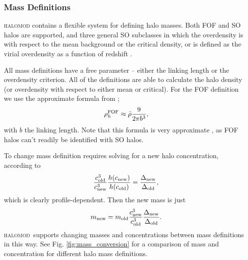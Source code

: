 \documentclass[5p,aas_macros]{elsarticle}
\newcommand{\halomod}{\textsc{halomod}\xspace} %
\providecommand{\DIFaddtex}[1]{{\protect\color{blue}\uwave{#1}}} %
\providecommand{\DIFaddbegin}{} %
\providecommand{\DIFaddend}{} %
\providecommand{\DIFadd}[1]{\texorpdfstring{\DIFaddtex{#1}}{#1}} %
\begin{document}
\subsubsection{Mass Definitions}
\label{sec:halomod:components:mass-def}
\textsc{halomod} contains a flexible system for defining halo masses. 
Both FOF and SO halos are supported, and three general SO subclasses in which the overdensity is with respect to the mean background or the critical density, or is defined as the virial overdensity as a function of redshift \citep{Bryan1998}. 

All mass definitions have a free parameter -- either the linking length or the overdensity criterion. All of the definitions are able to calculate the halo density (or overdensity with respect to either mean or critical). For the FOF definition we use the approximate formula from \cite{White2001};
\begin{equation}
    \rho_h^{\rm FOF} \approx \bar{\rho} \frac{9}{2\pi b^3},
\end{equation}
with $b$ the linking length. Note that this formula is very approximate \citep{More2011}, as FOF halos can't readily be identified with SO halos. 

To change mass definition requires solving for a new halo concentration, according to
\begin{equation}
    \DIFaddbegin \label{eq:convert_mass_c}
    \DIFaddend \frac{c_{\rm old}^3}{c_{\rm new}^3} \frac{h(c_{\rm new})}{h(c_{\rm old})} = \frac{\Delta_{\rm new}}{\Delta_{\rm old}},
\end{equation}
which is clearly profile-dependent. Then the new mass is just
\begin{equation}
    \DIFaddbegin \label{eq:convert_mass_m}
    \DIFaddend m_{\rm new} = m_{\rm old} \frac{c_{\rm new}^3}{c_{\rm old}^3} \frac{\Delta_{\rm new}}{\Delta_{\rm old}}.
\end{equation}
\halomod\  supports changing masses and concentrations \DIFaddbegin \DIFadd{(partially) }\DIFaddend between mass definitions in this way. 
See Fig. \ref{fig:mass_conversion} for a comparison of mass and concentration for different halo mass definitions.
\end{document}
